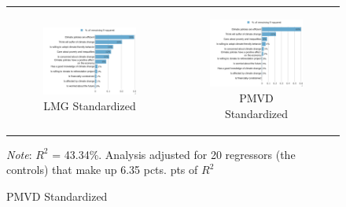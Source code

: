 \documentclass{article}
\begin{document}
\begin{figure}[h!]
\begin{center}
	\begin{tabular}{cc}
		\begin{subfigure}{0.5\textwidth}
		\caption{LMG Standardized}
			\includegraphics[width=\textwidth]{lmg_standard_standardized}
		\end{subfigure}&
		\begin{subfigure}{0.5\textwidth}
		\caption{PMVD Standardized}
			\includegraphics[width=\textwidth]{pmvd_standard_standardized}
		\end{subfigure}\\
	\end{tabular}
	{\footnotesize \textit{Note}:  $R^2$ = 43.34\%. Analysis adjusted for 20 regressors (the controls) that make up 6.35 pcts. pts of $R^2$}
\end{center}
\end{figure}
\end{document}
